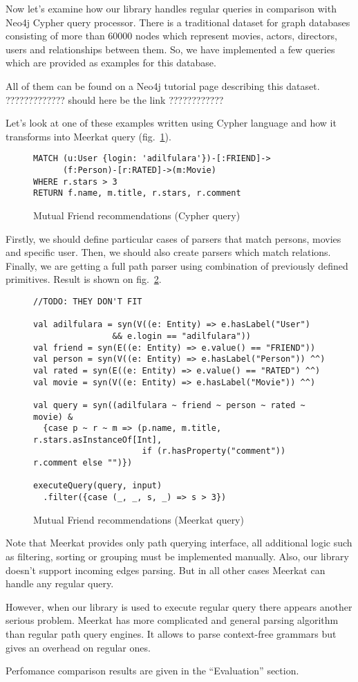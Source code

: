 Now let's examine how our library handles regular queries in comparison with Neo4j Cypher query processor.
There is a traditional dataset for graph databases consisting of more than 60000 nodes which represent
movies, actors, directors, users and relationships between them.
So, we have implemented a few queries which are provided as examples for this database.

All of them can be found on a Neo4j tutorial page describing this dataset.
????????????? should here be the link ????????????

Let's look at one of these examples written using Cypher language and how it transforms into Meerkat query
(fig.~\ref{fig:cypher_movie_query}).

\begin{figure}[h]
\begin{lstlisting}
MATCH (u:User {login: 'adilfulara'})-[:FRIEND]->
	  (f:Person)-[r:RATED]->(m:Movie)
WHERE r.stars > 3
RETURN f.name, m.title, r.stars, r.comment
\end{lstlisting}
\caption{Mutual Friend recommendations (Cypher query)}
\label{fig:cypher_movie_query}
\end{figure}

Firstly, we should define particular cases of parsers that match persons, movies and specific user.
Then, we should also create parsers which match relations.
Finally, we are getting a full path parser using combination of previously defined primitives.
Result is shown on fig.~\ref{fig:meerkat_movie_query}.

\begin{figure}[h]
\begin{lstlisting}
//TODO: THEY DON'T FIT

val adilfulara = syn(V((e: Entity) => e.hasLabel("User") 
			    && e.login == "adilfulara"))
val friend = syn(E((e: Entity) => e.value() == "FRIEND"))
val person = syn(V((e: Entity) => e.hasLabel("Person")) ^^)
val rated = syn(E((e: Entity) => e.value() == "RATED") ^^)
val movie = syn(V((e: Entity) => e.hasLabel("Movie")) ^^)

val query = syn((adilfulara ~ friend ~ person ~ rated ~ movie) &
  {case p ~ r ~ m => (p.name, m.title, r.stars.asInstanceOf[Int],
                      if (r.hasProperty("comment")) r.comment else "")})

executeQuery(query, input)
  .filter({case (_, _, s, _) => s > 3})
\end{lstlisting}
\caption{Mutual Friend recommendations (Meerkat query)}
\label{fig:meerkat_movie_query}
\end{figure}

Note that Meerkat provides only path querying interface, all additional logic such as
filtering, sorting or grouping must be implemented manually.
Also, our library doesn't support incoming edges parsing.
But in all other cases Meerkat can handle any regular query.

However, when our library is used to execute regular query there appears another serious problem.
Meerkat has more complicated and general parsing algorithm than regular path query engines.
It allows to parse context-free grammars but gives an overhead on regular ones.

Perfomance comparison results are given in the ``Evaluation'' section.